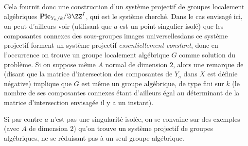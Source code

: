 Cela fournit donc une construction d'un syst\`eme projectif de groupes localement alg\'ebriques $\mathbf{Pic}_{Y_n/k}/\Im \ZZ^I$, qui est le syst\`eme cherch\'e. Dans le cas envisag\'e ici, on peut d'ailleurs voir (utilisant que $a$ est un point singulier isol\'e) que les composantes connexes des sous-groupes images universelles\pageoriginale dans ce syst\`eme projectif forment un syst\`eme projectif \emph{essentiellement constant}, donc en l'occurrence on trouve un groupe localement alg\'ebrique $G$ comme solution du probl\`eme. Si on suppose m\^eme $A$ normal de dimension $2$, alors une remarque de  (disant que la matrice d'intersection des composantes de $Y_{a}$ dans $X$ est d\'efinie n\'egative) implique que $G$ est m\^eme un groupe alg\'ebrique, \ie de type fini sur $k$ (le nombre de ses composantes connexes \'etant d'ailleurs \'egal au d\'eterminant de la matrice d'intersection envisag\'ee il y a un instant).

Si par contre $a$ n'est pas une singularit\'e isol\'ee, on se convainc sur des exemples (avec $A$ de dimension $2$) qu'on trouve un syst\`eme projectif de groupes alg\'ebriques, ne se r\'eduisant pas \`a un seul groupe alg\'ebrique.

